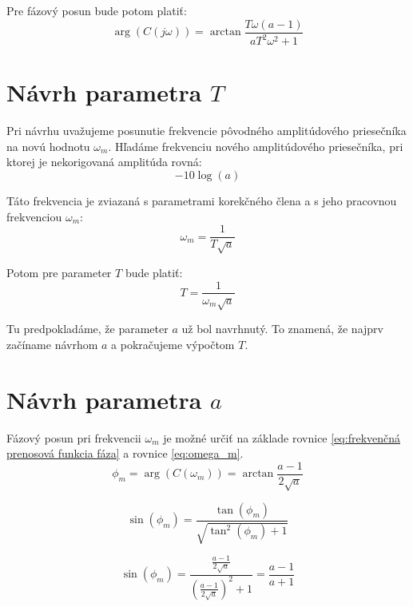 \documentclass[a4paper,10pt]{article}
\begin{document}
Pre fázový posun bude potom platiť:
\begin{equation}
\label{eq:frekvenčná prenosová funkcia fáza}
 \arg(C(j\omega))=\arctan{\frac{T\omega(a-1)}{aT^2\omega^2+1}}
\end{equation}

\pagebreak

\section{Návrh parametra $T$} 
Pri návrhu uvažujeme posunutie frekvencie pôvodného amplitúdového priesečníka na novú hodnotu $\omega_m$.
Hľadáme frekvenciu nového amplitúdového priesečníka, pri ktorej je nekorigovaná amplitúda rovná:
\begin{equation}
 -10\log(a)
\end{equation}

Táto frekvencia je zviazaná s parametrami korekčného člena a s jeho pracovnou frekvenciou $\omega_m$:
\begin{equation}
\label{eq:omega_m}
\omega_m=\frac{1}{T\sqrt{a}}
\end{equation}

Potom pre parameter $T$ bude platiť:
\begin{equation}
\label{eq:T}
 T=\frac{1}{\omega_m\sqrt{a}}
\end{equation}

Tu predpokladáme, že parameter $a$ už bol navrhnutý. To znamená, že najprv začíname návrhom $a$ a pokračujeme výpočtom $T$.

\section{Návrh parametra $a$} 
Fázový posun pri frekvencii $\omega_m$ je možné určiť na základe rovnice \eqref{eq:frekvenčná prenosová funkcia fáza} a rovnice \eqref{eq:omega_m}.
\begin{equation}
 \phi_m=\arg(C(\omega_m))=\arctan{\frac{a-1}{2\sqrt{a}}}
\end{equation}

\begin{equation}
 \sin(\phi_m)=\frac{\tan(\phi_m)}{\sqrt{\tan^2(\phi_m)+1}}
\end{equation}

\begin{equation}
 \sin(\phi_m)=\frac{\frac{a-1}{2\sqrt{a}}}{\left({\frac{a-1}{2\sqrt{a}}}\right)^2+1}=\frac{a-1}{a+1}
\end{equation}
\end{document}
